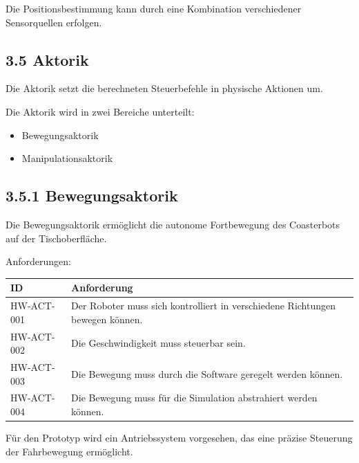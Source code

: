 \documentclass[
  a4paper,
  12pt,
  DIV=12,        %
  parskip=half,  %
  headings=small %
]{scrartcl}
\theoremstyle{definition}
\providecommand{\tightlist}{%
  \setlength{\itemsep}{0pt}\setlength{\parskip}{0pt}}
\theoremstyle{definition}
\providecommand{\tightlist}{%
  \setlength{\itemsep}{0pt}\setlength{\parskip}{0pt}}
\begin{document}
Die Positionsbestimmung kann durch eine Kombination verschiedener
Sensorquellen erfolgen.

\subsection{3.5 Aktorik}\label{aktorik}

Die Aktorik setzt die berechneten Steuerbefehle in physische Aktionen
um.

Die Aktorik wird in zwei Bereiche unterteilt:

\begin{itemize}
\tightlist
\item
  Bewegungsaktorik
\item
  Manipulationsaktorik
\end{itemize}

\subsection{3.5.1 Bewegungsaktorik}\label{bewegungsaktorik}

Die Bewegungsaktorik ermöglicht die autonome Fortbewegung des
Coasterbots auf der Tischoberfläche.

Anforderungen:

\begin{longtable}[]{@{}
  >{\raggedright\arraybackslash}p{}
  >{\raggedright\arraybackslash}p{}@{}}
\toprule\noalign{}
\begin{minipage}[b]{\linewidth}\raggedright
ID
\end{minipage} & \begin{minipage}[b]{\linewidth}\raggedright
Anforderung
\end{minipage} \\
\midrule\noalign{}
\endhead
\bottomrule\noalign{}
\endlastfoot
HW-ACT-001 & Der Roboter muss sich kontrolliert in verschiedene
Richtungen bewegen können. \\
HW-ACT-002 & Die Geschwindigkeit muss steuerbar sein. \\
HW-ACT-003 & Die Bewegung muss durch die Software geregelt werden
können. \\
HW-ACT-004 & Die Bewegung muss für die Simulation abstrahiert werden
können. \\
\end{longtable}

Für den Prototyp wird ein Antriebssystem vorgesehen, das eine präzise
Steuerung der Fahrbewegung ermöglicht.
\end{document}
